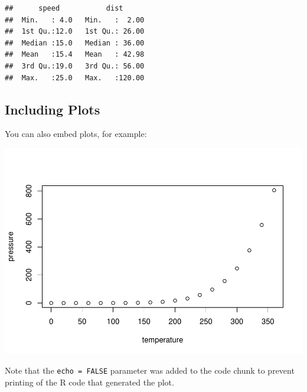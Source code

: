 \documentclass[
  9.5pt,
  a4paper,
  oneside]{article}
\begin{document}
\begin{verbatim}
##      speed           dist       
##  Min.   : 4.0   Min.   :  2.00  
##  1st Qu.:12.0   1st Qu.: 26.00  
##  Median :15.0   Median : 36.00  
##  Mean   :15.4   Mean   : 42.98  
##  3rd Qu.:19.0   3rd Qu.: 56.00  
##  Max.   :25.0   Max.   :120.00
\end{verbatim}

\hypertarget{including-plots}{%
\subsection{Including Plots}\label{including-plots}}

You can also embed plots, for example:

\includegraphics{as_files/figure-latex/pressure-1.pdf}

Note that the \texttt{echo\ =\ FALSE} parameter was added to the code
chunk to prevent printing of the R code that generated the plot.
\end{document}

